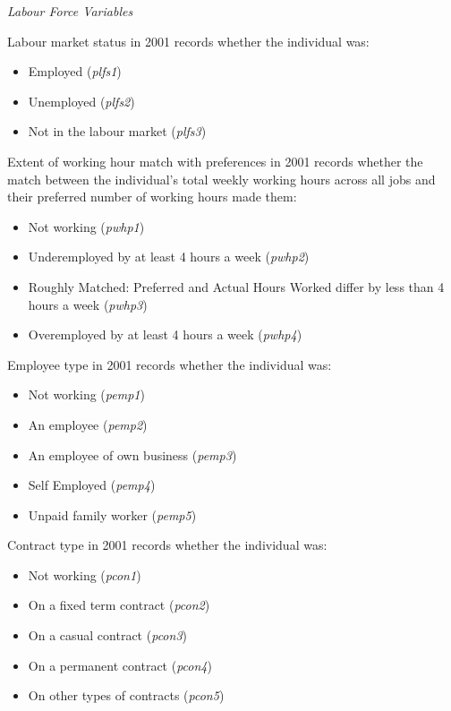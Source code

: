 \documentclass[12pt, a4paper]{article}
\begin{document}
\emph{Labour Force Variables}

Labour market status in 2001 records whether the individual was:
\begin{itemize}
  \item Employed (\textit{p\textunderscore{}lfs1})
  \item Unemployed (\textit{p\textunderscore{}lfs2})
  \item Not in the labour market (\textit{p\textunderscore{}lfs3})
\end{itemize} 

Extent of working hour match with preferences in 2001 records whether the match between the individual’s total weekly working hours across all jobs and their preferred number of working hours made them:
\begin{itemize}
  \item Not working (\textit{p\textunderscore{}whp1})
  \item Underemployed by at least 4 hours a week  (\textit{p\textunderscore{}whp2})
  \item Roughly Matched: Preferred and Actual Hours Worked differ by less than 4 hours a week (\textit{p\textunderscore{}whp3})
  \item Overemployed by at least 4 hours a week  (\textit{p\textunderscore{}whp4})
\end{itemize}  
  
Employee type in 2001 records whether the individual was:
\begin{itemize}
  \item Not working (\textit{p\textunderscore{}emp1})
  \item An employee (\textit{p\textunderscore{}emp2})
  \item An employee of own business (\textit{p\textunderscore{}emp3})
  \item Self Employed (\textit{p\textunderscore{}emp4})
  \item Unpaid family worker (\textit{p\textunderscore{}emp5})
\end{itemize}  
  
Contract type in 2001 records whether the individual was:
\begin{itemize}
  \item Not working (\textit{p\textunderscore{}con1})
  \item On a fixed term contract (\textit{p\textunderscore{}con2})
  \item On a casual contract (\textit{p\textunderscore{}con3})
  \item On a permanent contract (\textit{p\textunderscore{}con4})
  \item On other types of contracts (\textit{p\textunderscore{}con5})
\end{itemize}  
  
\end{document}
